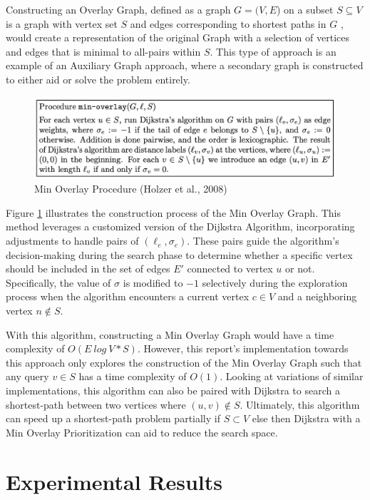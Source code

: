 \documentclass{article}
\begin{document}
Constructing an Overlay Graph, defined as a graph $G = (V,E$) on a subset $S \subseteq V$ is a graph with vertex set $S$ and edges corresponding to shortest paths in $G$ \cite{Holzer2008}, would create a representation
of the original Graph with a selection of vertices and edges that is minimal
to all-pairs within $S$. This type of approach is an example of an Auxiliary Graph approach, where a secondary graph is constructed to either
aid or solve the problem entirely.

\begin{figure}
    \centering
    \includegraphics[width=0.7\linewidth]{img/minoverlay.png}
    \caption{Min Overlay Procedure (Holzer et al., 2008)}
    \label{fig:minoverlay}
\end{figure}

Figure \ref{fig:minoverlay} illustrates the construction process of the Min Overlay Graph. This method leverages a customized version of the Dijkstra Algorithm, incorporating adjustments to handle pairs of $(\ell_e, \sigma_e)$. These pairs guide the algorithm's decision-making during the search phase to determine whether a specific vertex should be included in the set of edges \(E'\) connected to vertex \(u\) or not. Specifically, the value of \(\sigma\) is modified to \( -1 \) selectively during the exploration process when the algorithm encounters a current vertex \(c \in V\) and a neighboring vertex \(n \notin S\).

With this algorithm, constructing a Min Overlay Graph would have a time complexity of $O(E \ log \ V * S)$. However, this report's implementation towards this approach only explores the construction of the Min Overlay Graph such that any query $v \in S$ has a time complexity of $O(1)$. Looking at variations of similar implementations, this algorithm can also be paired with Dijkstra to search a shortest-path between two vertices where $(u,v) \notin S$. Ultimately, this algorithm can speed up a shortest-path problem partially if $S \subset V$ else then Dijkstra with a Min Overlay Prioritization can aid to reduce the search space.

\section{Experimental Results}
\end{document}
